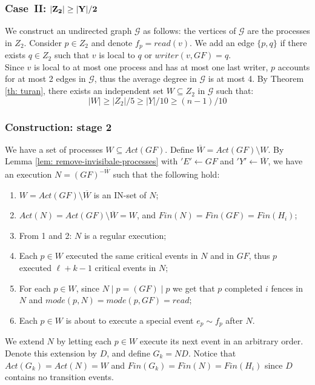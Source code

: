 \subsubsection*{\hspace{5mm} Case\ II: $\bf |Z_2| \geq |Y|/2$}
We construct an undirected graph $\mathcal{G}$ as follows: the vertices of $\mathcal{G}$ are the processes in $Z_2$. Consider $p \in Z_2$ and denote $f_p = read(v)$. We add an edge $\{p,q\}$ if there exists $q \in Z_2$ such that $v$ is local to $q$ or $writer(v, G F) = q$.
\\ Since $v$ is local to at most one process and has at most one last writer, $p$ accounts for at most 2 edges in $\mathcal{G}$, thus the average degree in $\mathcal{G}$ is at most 4. By Theorem \ref{th: turan}, there exists an independent set $W \subseteq Z_2$ in $\mathcal{G}$ such that:
$$|W| \geq |Z_2|/5 \geq |Y|/10 \geq (n-1)/10$$

\subsubsection{Construction: stage 2}
We have a set of processes $W \subseteq Act(G F)$. Define $\overline{W} = Act(G F) \setminus W$. By Lemma \ref{lem: remove-invisibale-processes} with $'E' \leftarrow G F$ and $'Y' \leftarrow \overline{W}$, we have an execution $N = (G F)^{-\overline{W}}$ such that the following hold:
\begin{enumerate}
	\item $W = Act(G F) \setminus \overline{W}$ is an IN-set of $N$;
	\item $Act(N) = Act(G F) \setminus \overline{W} = W$, and $Fin(N) = Fin(G F) = Fin(H_i)$;
	\item From 1 and 2: $N$ is a regular execution;
	\item Each $p \in W$ executed the same critical events in $N$ and in $G F$, thus $p$ executed $\ell+k-1$ critical events in $N$;
	\item For each $p \in W$, since $N \mid p = (G F) \mid p$ we get that $p$ completed $i$ fences in $N$ and $mode(p,N) = mode(p, G F) = read$;
	\item Each $p \in W$ is about to execute a special event $e_p \sim f_p$ after $N$.
\end{enumerate}

We extend $N$ by letting each $p \in W$ execute its next event in an arbitrary order. Denote this extension by $D$, and define $G_k = N D$. Notice that $Act(G_k) = Act(N) = W$ and $Fin(G_k) = Fin(N) = Fin(H_i)$ since $D$ contains no transition events.

